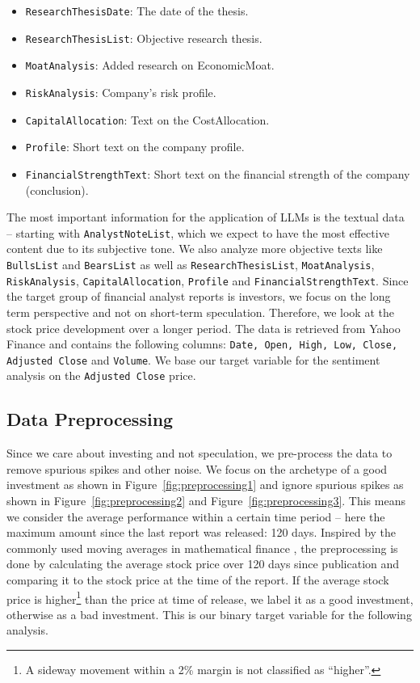 \documentclass[conference]{IEEEtran}
\begin{document}
\begin{itemize}
  \item \texttt{ResearchThesisDate}: The date of the thesis.
  \item \texttt{ResearchThesisList}: Objective research thesis.
  \item \texttt{MoatAnalysis}: Added research on EconomicMoat.
  \item \texttt{RiskAnalysis}: Company's risk profile. 
  \item \texttt{CapitalAllocation}: Text on the CostAllocation. 
  \item \texttt{Profile}: Short text on the company profile.
  \item \texttt{FinancialStrengthText}: Short text on the financial strength of the company (conclusion).
\end{itemize}
The most important information for the application of LLMs is the textual data -- starting with \texttt{AnalystNoteList}, which we expect to have the most effective content due to its subjective tone. We also analyze more objective texts like \texttt{BullsList} and \texttt{BearsList} as well as \texttt{ResearchThesisList}, \texttt{MoatAnalysis}, \texttt{RiskAnalysis}, \texttt{CapitalAllocation}, \texttt{Profile} and \texttt{FinancialStrengthText}.
Since the target group of financial analyst reports is investors, we focus on the long term perspective and not on short-term speculation. Therefore, we look at the stock price development over a longer period. The data is retrieved from Yahoo Finance and contains the following columns: \texttt{Date, Open, High, Low, Close, Adjusted Close} and \texttt{Volume}. We base our target variable for the sentiment analysis on the \texttt{Adjusted Close} price.

\subsection{Data Preprocessing}%
Since we care about investing and not speculation, we pre-process the data to remove spurious spikes and other noise. We focus on the archetype of a good investment as shown in Figure~\ref{fig:preprocessing1} and ignore spurious spikes as shown in Figure~\ref{fig:preprocessing2} and Figure~\ref{fig:preprocessing3}. This means we consider the average performance within a certain time period -- here the maximum amount since the last report was released: 120 days. Inspired by the commonly used moving averages in mathematical finance \cite{Hull2021}, the preprocessing is done by calculating the average stock price over 120 days since publication and comparing it to the stock price at the time of the report. If the average stock price is higher\footnote{A sideway movement within a 2\% margin is not classified as ``higher''.} than the price at time of release, we label it as a good investment, otherwise as a bad investment. This is our binary target variable for the following analysis.
\end{document}
